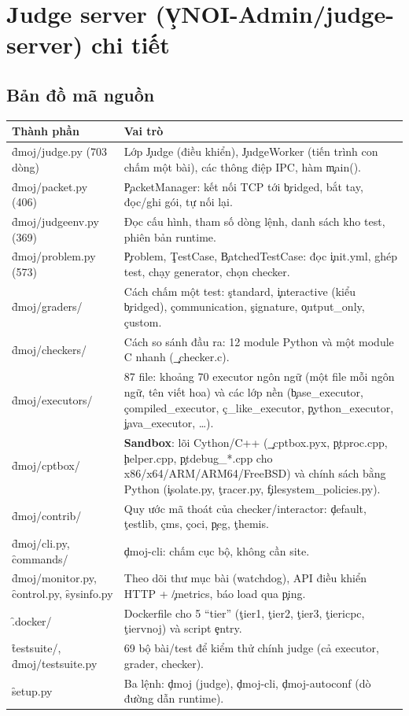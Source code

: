 \section{Judge server \texorpdfstring{(\c{VNOI-Admin/judge-server})}{(judge-server)} chi tiết}\label{sec:judge}

\subsection{Bản đồ mã nguồn}
\begin{center}\small
\begin{tabularx}{\textwidth}{@{}L{3.6cm}Y@{}}
\toprule
Thành phần & Vai trò \\
\midrule
\f{dmoj/judge.py} (703 dòng) & Lớp \c{Judge} (điều khiển), \c{JudgeWorker} (tiến trình con chấm một bài), các thông điệp IPC, hàm \c{main()}. \\
\f{dmoj/packet.py} (406) & \c{PacketManager}: kết nối TCP tới \c{bridged}, bắt tay, đọc/ghi gói, tự nối lại. \\
\f{dmoj/judgeenv.py} (369) & Đọc cấu hình, tham số dòng lệnh, danh sách kho test, phiên bản runtime. \\
\f{dmoj/problem.py} (573) & \c{Problem}, \c{TestCase}, \c{BatchedTestCase}: đọc \c{init.yml}, ghép test, chạy generator, chọn checker. \\
\f{dmoj/graders/} & Cách chấm một test: \c{standard}, \c{interactive} (kiểu \c{bridged}), \c{communication}, \c{signature}, \c{output_only}, \c{custom}. \\
\f{dmoj/checkers/} & Cách so sánh đầu ra: 12 module Python và một module C nhanh (\c{_checker.c}). \\
\f{dmoj/executors/} & 87 file: khoảng 70 executor ngôn ngữ (một file mỗi ngôn ngữ, tên viết hoa) và các lớp nền (\c{base_executor}, \c{compiled_executor}, \c{c_like_executor}, \c{python_executor}, \c{java_executor}, \ldots). \\
\f{dmoj/cptbox/} & \textbf{Sandbox}: lõi Cython/C++ (\c{_cptbox.pyx}, \c{ptproc.cpp}, \c{helper.cpp}, \c{ptdebug_*.cpp} cho x86/x64/ARM/ARM64/FreeBSD) và chính sách bằng Python (\c{isolate.py}, \c{tracer.py}, \c{filesystem_policies.py}). \\
\f{dmoj/contrib/} & Quy ước mã thoát của checker/interactor: \c{default}, \c{testlib}, \c{cms}, \c{coci}, \c{peg}, \c{themis}. \\
\f{dmoj/cli.py}, \f{commands/} & \c{dmoj-cli}: chấm cục bộ, không cần site. \\
\f{dmoj/monitor.py}, \f{control.py}, \f{sysinfo.py} & Theo dõi thư mục bài (watchdog), API điều khiển HTTP + \c{/metrics}, báo load qua \c{ping}. \\
\f{.docker/} & Dockerfile cho 5 ``tier'' (\c{tier1}, \c{tier2}, \c{tier3}, \c{tiericpc}, \c{tiervnoj}) và script \c{entry}. \\
\f{testsuite/}, \f{dmoj/testsuite.py} & 69 bộ bài/test để kiểm thử chính judge (cả executor, grader, checker). \\
\f{setup.py} & Ba lệnh: \c{dmoj} (judge), \c{dmoj-cli}, \c{dmoj-autoconf} (dò đường dẫn runtime). \\
\bottomrule
\end{tabularx}
\end{center}

